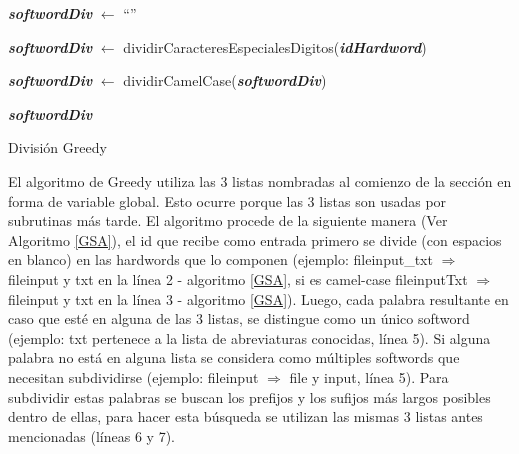 \begin{algorithm}[b!]%
\LinesNumbered%

\BlankLine
\textit{\textbf{softwordDiv}} $\leftarrow$ “”

\textit{\textbf{softwordDiv}} $\leftarrow$ dividirCaracteresEspecialesDigitos(\textit{\textbf{idHardword}})

\textit{\textbf{softwordDiv}} $\leftarrow$ dividirCamelCase(\textit{\textbf{softwordDiv}})

\BlankLine
{}
\BlankLine
\Return \textit{\textbf{softwordDiv}} 

\caption{División Greedy\label{GSA}}
\end{algorithm}



El algoritmo de Greedy utiliza las 3 listas nombradas al comienzo de la sección en forma de variable global. Esto ocurre porque las 3 listas son usadas por subrutinas más tarde. El algoritmo procede de la siguiente manera (Ver Algoritmo \ref{GSA}), el id que recibe como entrada primero se divide (con espacios en blanco) en las hardwords que lo componen (ejemplo: \textsf{fileinput\_txt} $\Rightarrow$ \mbox{\textsf{fileinput}} y \textsf{txt} en la línea 2 - algoritmo \ref{GSA}, si es camel-case \textsf{fileinputTxt} $\Rightarrow$ \textsf{fileinput} y \textsf{txt} en la línea 3 - algoritmo \ref{GSA}). Luego, cada palabra resultante en caso que esté en alguna de las 3 listas, se distingue como un único softword (ejemplo: \textsf{txt} pertenece a la lista de abreviaturas conocidas, línea 5). Si alguna palabra no está en alguna lista se considera como múltiples softwords que necesitan subdividirse (ejemplo: \textsf{fileinput} $\Rightarrow$ \textsf{file} y \textsf{input}, línea 5).
Para subdividir estas palabras se buscan los prefijos y los sufijos más largos posibles dentro de ellas, para hacer esta búsqueda se utilizan las mismas 3 listas antes mencionadas (líneas 6 y 7).


